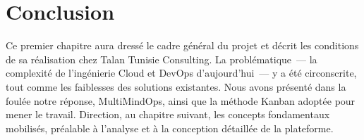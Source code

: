\section{Conclusion}
Ce premier chapitre aura dressé le cadre général du projet et décrit les conditions de sa
réalisation chez Talan Tunisie Consulting. La problématique~--- la complexité de l'ingénierie
Cloud et DevOps d'aujourd'hui~--- y a été circonscrite, tout comme les faiblesses des
solutions existantes. Nous avons présenté dans la foulée notre réponse, MultiMindOps, ainsi
que la méthode Kanban adoptée pour mener le travail. Direction, au chapitre suivant, les
concepts fondamentaux mobilisés, préalable à l'analyse et à la conception détaillée de la
plateforme.
